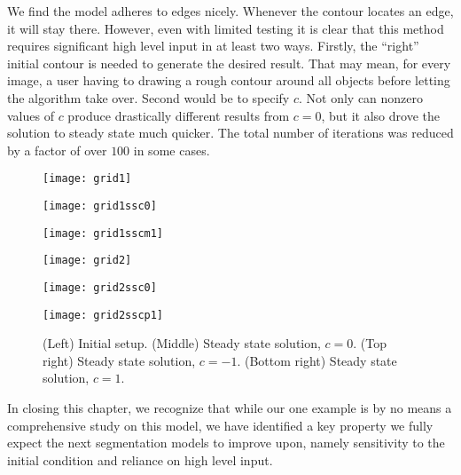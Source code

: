 We find the model adheres to edges nicely. Whenever the contour locates an edge, it will stay there. However, even with limited testing it is clear that this method requires significant high level input in at least two ways. Firstly, the ``right'' initial contour is needed to generate the desired result. That may mean, for every image, a user having to drawing a rough contour around all objects before letting the algorithm take over. Second would be to specify $c$. Not only can nonzero values of $c$ produce drastically different results from $c = 0$, but it also drove the solution to steady state much quicker. The total number of iterations was reduced by a factor of over $100$ in some cases.
	
	\begin{figure}[htb!]
		\centering
		\begin{minipage}{0.31\textwidth}
					\texttt{[image: grid1]}
		\end{minipage}%
		\begin{minipage}{0.31\textwidth}
			\texttt{[image: grid1ssc0]}
		\end{minipage}%
		\begin{minipage}{0.31\textwidth}
			\texttt{[image: grid1sscm1]}
		\end{minipage}
		\begin{minipage}{0.31\textwidth}
			\texttt{[image: grid2]}
		\end{minipage}%
		\begin{minipage}{0.31\textwidth}
			\texttt{[image: grid2ssc0]}
		\end{minipage}%
		\begin{minipage}{0.31\textwidth}
			\texttt{[image: grid2sscp1]}
		\end{minipage}
		
		\caption{(Left) Initial setup. (Middle) Steady state solution, $c = 0$. (Top right) Steady state solution, $c = -1$. (Bottom right) Steady state solution, $c = 1$.}\label{fig:grid}
	\end{figure}



In closing this chapter, we recognize that while our one example is by no means a comprehensive study on this model, we have identified a key property we fully expect the next segmentation models to improve upon, namely sensitivity to the initial condition and reliance on high level input.
	

